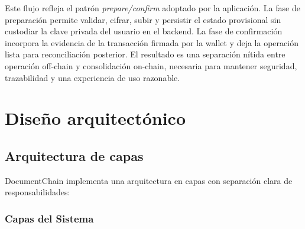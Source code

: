 \documentclass[11pt, a4paper]{article}
\begin{document}
Este flujo refleja el patrón \textit{prepare/confirm} adoptado por la aplicación. La fase de preparación permite validar, cifrar, subir y persistir el estado provisional sin custodiar la clave privada del usuario en el backend. La fase de confirmación incorpora la evidencia de la transacción firmada por la wallet y deja la operación lista para reconciliación posterior. El resultado es una separación nítida entre operación off-chain y consolidación on-chain, necesaria para mantener seguridad, trazabilidad y una experiencia de uso razonable.

\section{Diseño arquitectónico}

\subsection{Arquitectura de capas}

DocumentChain implementa una arquitectura en capas con separación clara de responsabilidades:

\subsubsection{Capas del Sistema}
\end{document}

